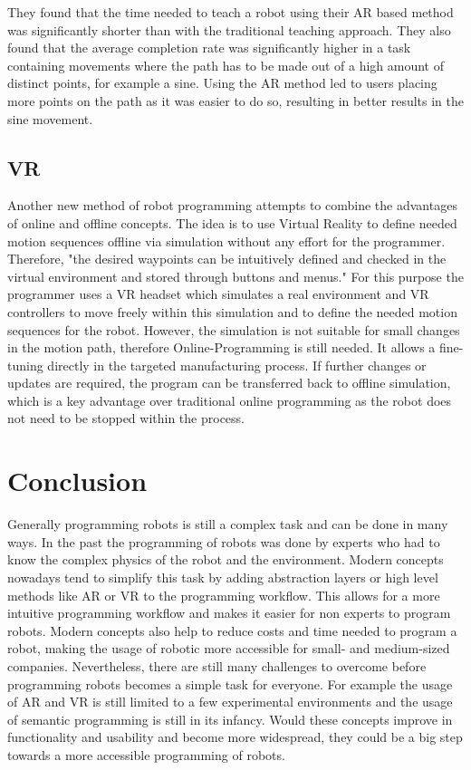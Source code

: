 \documentclass[conference]{IEEEtran}
\begin{document}
        They found that the time needed to teach a robot using their AR based method was significantly shorter than with the traditional teaching approach. 
        They also found that the average completion rate was significantly higher in a task containing movements where the path has to be made out of a high amount of distinct points, for example a sine. Using the AR method led to users placing more points on the path as it was easier to do so, resulting in better results in the sine movement.
        \cite[pp. 4 - 5]{p3}

    \subsection{VR}
        Another new method of robot programming attempts to combine the advantages of online and offline concepts. The idea is to use Virtual Reality to define needed motion sequences offline via simulation without any effort for the programmer. Therefore, "the desired waypoints can be intuitively defined and checked in the virtual environment and stored through buttons and menus."  \cite[p. 625]{p2} For this purpose the programmer uses a VR headset which simulates a real environment and VR controllers to move freely within this simulation and to define the needed motion sequences for the robot. \cite[p. 627]{p2}
        However, the simulation is not suitable for small changes in the motion path, therefore Online-Programming is still needed. It allows a fine-tuning directly in the targeted manufacturing process. If further changes or updates are required, the program can be transferred back to offline simulation, which is a key advantage over traditional online programming as the robot does not need to be stopped within the process. \cite[p. 625]{p2}

\section{Conclusion}

    Generally programming robots is still a complex task and can be done in many ways. 
    In the past the programming of robots was done by experts who had to know the complex physics of the robot and the environment. Modern concepts nowadays tend to simplify this task by adding abstraction layers or high level methods like AR or VR to the programming workflow. This allows for a more intuitive programming workflow and makes it easier for non experts to program robots. Modern concepts also help to reduce costs and time needed to program a robot, making the usage of robotic more accessible for small- and medium-sized companies.
    Nevertheless, there are still many challenges to overcome before programming robots becomes a simple task for everyone. For example the usage of AR and VR is still limited to a few experimental environments and the usage of semantic programming is still in its infancy. Would these concepts improve in functionality and usability and become more widespread, they could be a big step towards a more accessible programming of robots.
\end{document}
